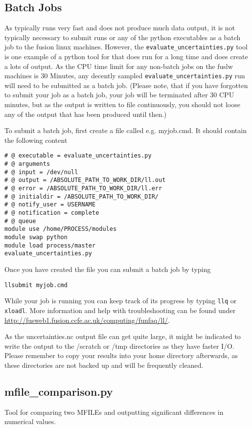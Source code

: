 \subsection{Batch Jobs}
As \process\/ typically runs very fast and does not produce much data output, it is not typically necessary to submit \process\/ runs or any of the python executables as a batch job to the fusion linux machines. However, the \texttt{evaluate\_uncertainties.py} tool is one example of a python tool for \process\/ that does run for a long time and does create a lots of output. As the CPU time limit for any non-batch jobs on the fuslw machines is 30 Minutes, any decently sampled \texttt{evaluate\_uncertainties.py} run will need to be submitted as a batch job. (Please note, that if you have forgotten to submit your job as a batch job, your job will be terminated after 30 CPU minutes, but as the output is written to file continuously, you should not loose any of the output that has been produced until then.)

To submit a batch job, first create a file called e.g. myjob.cmd. It should contain the following content
\begin{verbatim}
# @ executable = evaluate_uncertainties.py
# @ arguments 
# @ input = /dev/null
# @ output = /ABSOLUTE_PATH_TO_WORK_DIR/ll.out
# @ error = /ABSOLUTE_PATH_TO_WORK_DIR/ll.err
# @ initialdir = /ABSOLUTE_PATH_TO_WORK_DIR/
# @ notify_user = USERNAME
# @ notification = complete
# @ queue
module use /home/PROCESS/modules
module swap python
module load process/master
evaluate_uncertainties.py
\end{verbatim}
Once you have created the file you can submit a batch job by typing 
\begin{verbatim}
llsubmit myjob.cmd
\end{verbatim}

While your job is running you can keep track of its progress by typing \texttt{llq} or \texttt{xloadl}. More information and help with troubleshooting can be found under \url{http://fusweb1.fusion.ccfe.ac.uk/computing/funfaq/ll/}.

As the uncertainties.nc output file can get quite large, it might be indicated to write the output to the /scratch or /tmp directories as they have faster I/O. Please remember to copy your results into your home directory afterwards, as these directories are not backed up and will be frequently cleaned.


\subsection{mfile\_comparison.py}
Tool for comparing two MFILEs and outputting significant differences in numerical values.

